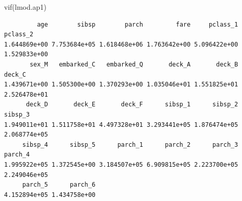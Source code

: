 \documentclass[
  letterpaper,
  DIV=11,
  numbers=noendperiod]{scrartcl}
\newenvironment{Shaded}{\begin{snugshade}}{\end{snugshade}}
\newcommand{\FunctionTok}[1]{\textcolor[rgb]{0.28,0.35,0.67}{#1}}
\newcommand{\NormalTok}[1]{\textcolor[rgb]{0.00,0.23,0.31}{#1}}
\begin{document}
\begin{Shaded}
\begin{Highlighting}[]
\FunctionTok{vif}\NormalTok{(lmod.ap1)}
\end{Highlighting}
\end{Shaded}

\begin{verbatim}
         age        sibsp        parch         fare     pclass_1     pclass_2 
1.644869e+00 7.753684e+05 1.618468e+06 1.763642e+00 5.096422e+00 1.529833e+00 
       sex_M   embarked_C   embarked_Q       deck_A       deck_B       deck_C 
1.439671e+00 1.505300e+00 1.370293e+00 1.035046e+01 1.551825e+01 2.526478e+01 
      deck_D       deck_E       deck_F      sibsp_1      sibsp_2      sibsp_3 
1.949011e+01 1.511758e+01 4.497328e+01 3.293441e+05 1.876474e+05 2.068774e+05 
     sibsp_4      sibsp_5      parch_1      parch_2      parch_3      parch_4 
1.995922e+05 1.372545e+00 3.184507e+05 6.909815e+05 2.223700e+05 2.249046e+05 
     parch_5      parch_6 
4.152894e+05 1.434758e+00 
\end{verbatim}
\end{document}
